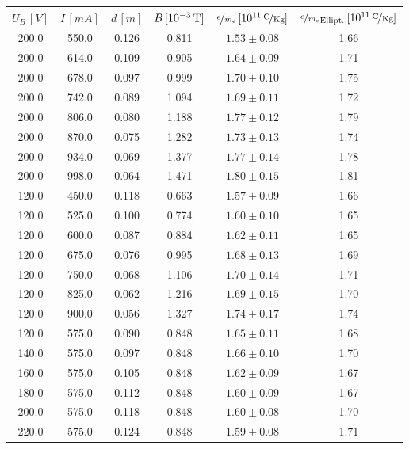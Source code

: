 \begin{table}[htb]
\centering
\begin{tabular}{|c|c|c|c|c|c|}
\hline
$U_B\,[\unit{V}]$ & $I\,[\unit{mA}]$ & $d\,[\unit{m}]$ & $B\,[\unit[10^{-3}]{T}]$ & $\nicefrac{e}{m_\mathrm{e}}\,[\unitfrac[10^{11}]{C}{Kg}]$ & $\nicefrac{e}{m_\mathrm{e}}_\mathrm{Ellipt.}\,[\unitfrac[10^{11}]{C}{Kg}]$ \\
\hline
200.0 & 550.0 & 0.126 & 0.811 & $1.53 \pm 0.08$ & 1.66 \\
\hline
200.0 & 614.0 & 0.109 & 0.905 & $1.64 \pm 0.09$ & 1.71 \\
\hline
200.0 & 678.0 & 0.097 & 0.999 & $1.70 \pm 0.10$ & 1.75 \\
\hline
200.0 & 742.0 & 0.089 & 1.094 & $1.69 \pm 0.11$ & 1.72 \\
\hline
200.0 & 806.0 & 0.080 & 1.188 & $1.77 \pm 0.12$ & 1.79 \\
\hline
200.0 & 870.0 & 0.075 & 1.282 & $1.73 \pm 0.13$ & 1.74 \\
\hline
200.0 & 934.0 & 0.069 & 1.377 & $1.77 \pm 0.14$ & 1.78 \\
\hline
200.0 & 998.0 & 0.064 & 1.471 & $1.80 \pm 0.15$ & 1.81 \\
\hline
120.0 & 450.0 & 0.118 & 0.663 & $1.57 \pm 0.09$ & 1.66 \\
\hline
120.0 & 525.0 & 0.100 & 0.774 & $1.60 \pm 0.10$ & 1.65 \\
\hline
120.0 & 600.0 & 0.087 & 0.884 & $1.62 \pm 0.11$ & 1.65 \\
\hline
120.0 & 675.0 & 0.076 & 0.995 & $1.68 \pm 0.13$ & 1.69 \\
\hline
120.0 & 750.0 & 0.068 & 1.106 & $1.70 \pm 0.14$ & 1.71 \\
\hline
120.0 & 825.0 & 0.062 & 1.216 & $1.69 \pm 0.15$ & 1.70 \\
\hline
120.0 & 900.0 & 0.056 & 1.327 & $1.74 \pm 0.17$ & 1.74 \\
\hline
120.0 & 575.0 & 0.090 & 0.848 & $1.65 \pm 0.11$ & 1.68 \\
\hline
140.0 & 575.0 & 0.097 & 0.848 & $1.66 \pm 0.10$ & 1.70 \\
\hline
160.0 & 575.0 & 0.105 & 0.848 & $1.62 \pm 0.09$ & 1.67 \\
\hline
180.0 & 575.0 & 0.112 & 0.848 & $1.60 \pm 0.09$ & 1.67 \\
\hline
200.0 & 575.0 & 0.118 & 0.848 & $1.60 \pm 0.08$ & 1.70 \\
\hline
220.0 & 575.0 & 0.124 & 0.848 & $1.59 \pm 0.08$ & 1.71 \\

\end{tabular}
\end{table}
